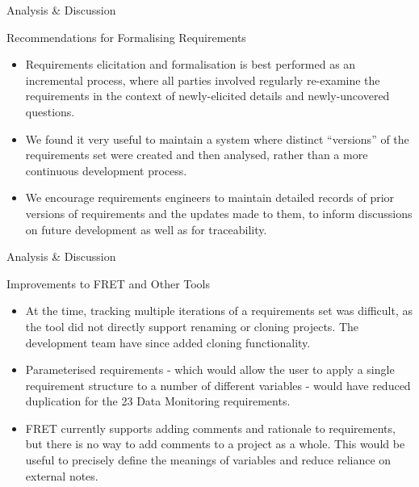 \documentclass[11pt, aspectratio=169, table]{beamer}
\begin{document}
\begin{frame}{Analysis \& Discussion}
\begin{block}{Recommendations for Formalising Requirements}
\begin{itemize}
	\item Requirements elicitation and formalisation is best performed as an incremental process, where all parties involved regularly re-examine the requirements in the context of newly-elicited details and newly-uncovered questions.
	
	\item We found it very useful to maintain a system where distinct ``versions'' of the requirements set were created and then analysed, rather than a more continuous development process.
	
	\item We encourage requirements engineers to maintain detailed records of prior versions of requirements and the updates made to them, to inform discussions on future development as well as for traceability.
\end{itemize}
\end{block}
\end{frame}


\begin{frame}{Analysis \& Discussion}
\begin{block}{Improvements to FRET and Other Tools}
\begin{itemize}
	\item At the time, tracking multiple iterations of a \fretish requirements set was difficult, as the tool did not directly support renaming or cloning projects. The development team have since added cloning functionality.
	
	\item Parameterised requirements - which would allow the user to apply a single requirement structure to a number of different variables - would have reduced duplication for the 23 Data Monitoring requirements.
	
	\item FRET currently supports adding comments and rationale to requirements, but there is no way to add comments to a project as a whole. This would be useful to precisely define the meanings of variables and reduce reliance on external notes.
\end{itemize}
\end{block}
\end{frame}
\end{document}

